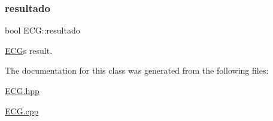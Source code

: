 \subsubsection{\texorpdfstring{resultado}{resultado}}
{\footnotesize\ttfamily bool E\+C\+G\+::resultado\hspace{0.3cm}{\ttfamily [private]}}



\hyperlink{class_e_c_g}{E\+CG}\textquotesingle{}s result. 



The documentation for this class was generated from the following files\+:\begin{DoxyCompactItemize}
\item 
\hyperlink{_e_c_g_8hpp}{E\+C\+G.\+hpp}\item 
\hyperlink{_e_c_g_8cpp}{E\+C\+G.\+cpp}\end{DoxyCompactItemize}
